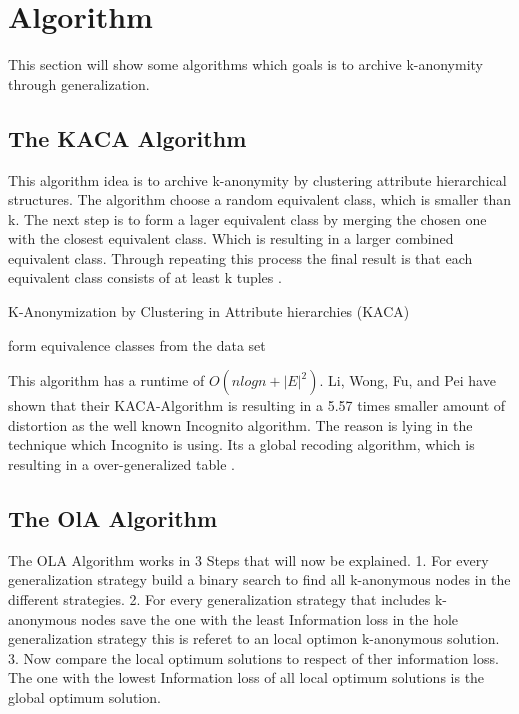 \documentclass{llncs}
\begin{document}
\section{Algorithm}
This section will show some algorithms which goals is to archive k-anonymity through generalization. 

\subsection{The KACA Algorithm}
This algorithm idea is to archive k-anonymity by clustering attribute hierarchical structures. The algorithm choose a random equivalent class, which is smaller than k. The next step is to form a lager equivalent class by merging the chosen  one with the closest equivalent class. Which is resulting in a larger combined equivalent class. Through repeating this process the final result is that each equivalent class consists of at least k tuples  \cite{li2006achieving}.\\
\begin{algorithm}[H]
	\caption{K-Anonymization by Clustering in Attribute hierarchies (KACA) \cite{li2006achieving}}
	form equivalence classes from the data set\\
\end{algorithm}
This algorithm has a runtime of $O(nlogn + |E|^{2})$. Li, Wong, Fu, and Pei have shown that their KACA-Algorithm is resulting in a 5.57 times smaller amount of distortion as the well known Incognito algorithm. The reason is lying in the technique which Incognito is using. Its a global recoding algorithm, which is resulting in a over-generalized table \cite{li2006achieving}.
\subsection{The OlA Algorithm }
The OLA Algorithm works in 3 Steps that will now be explained.
1.	For every generalization strategy build a binary search to find all k-anonymous nodes in the different strategies.
2.	For every generalization strategy that includes k-anonymous nodes save the one with the least Information loss in the hole generalization strategy this is referet to an local optimon k-anonymous solution.
3.	Now compare the local optimum solutions to respect of ther information loss. The one with the lowest Information loss of all local optimum solutions is  the global optimum solution.
\end{document}
